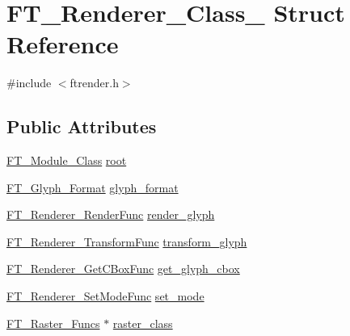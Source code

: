 \hypertarget{struct_f_t___renderer___class__}{}\section{F\+T\+\_\+\+Renderer\+\_\+\+Class\+\_\+ Struct Reference}
\label{struct_f_t___renderer___class__}


{\ttfamily \#include $<$ftrender.\+h$>$}

\subsection*{Public Attributes}
\begin{DoxyCompactItemize}
\item 
\mbox{\hyperlink{ftmodapi_8h_a1bdc5c23cae8b7c61c05966edc4e8343}{F\+T\+\_\+\+Module\+\_\+\+Class}} \mbox{\hyperlink{struct_f_t___renderer___class___a3df4509f1de704596bf4237d6ff8cbd4}{root}}
\item 
\mbox{\hyperlink{ftimage_8h_aeca0d10a27aedecbf96515e0628aff1f}{F\+T\+\_\+\+Glyph\+\_\+\+Format}} \mbox{\hyperlink{struct_f_t___renderer___class___a2c8602452fae27379a6f85bbcb4b525c}{glyph\+\_\+format}}
\item 
\mbox{\hyperlink{ftrender_8h_af45e60c86537cf1989bf4e654e2b76e7}{F\+T\+\_\+\+Renderer\+\_\+\+Render\+Func}} \mbox{\hyperlink{struct_f_t___renderer___class___a7a022b8358ce3a06620c62f3542d0d2b}{render\+\_\+glyph}}
\item 
\mbox{\hyperlink{ftrender_8h_ab4503afff651cd78750fd9d3218a9237}{F\+T\+\_\+\+Renderer\+\_\+\+Transform\+Func}} \mbox{\hyperlink{struct_f_t___renderer___class___a2aef09ecdabacf5628ef29fb3d179def}{transform\+\_\+glyph}}
\item 
\mbox{\hyperlink{ftrender_8h_adba414b141b3605331209b8961c3ae2a}{F\+T\+\_\+\+Renderer\+\_\+\+Get\+C\+Box\+Func}} \mbox{\hyperlink{struct_f_t___renderer___class___a4f9dc9b6d86504a8d3b04b4e72936e76}{get\+\_\+glyph\+\_\+cbox}}
\item 
\mbox{\hyperlink{ftrender_8h_a7ed568cf54b436823fea2f8a8864854b}{F\+T\+\_\+\+Renderer\+\_\+\+Set\+Mode\+Func}} \mbox{\hyperlink{struct_f_t___renderer___class___a7cfd4795107157aad4f7efcab77a0f64}{set\+\_\+mode}}
\item 
\mbox{\hyperlink{ftimage_8h_aacdff3aaf6e2dea8cfd9c3b90e15728c}{F\+T\+\_\+\+Raster\+\_\+\+Funcs}} $\ast$ \mbox{\hyperlink{struct_f_t___renderer___class___a5af75b9f582f98f9f74dbcbc530c7e88}{raster\+\_\+class}}
\end{DoxyCompactItemize}


